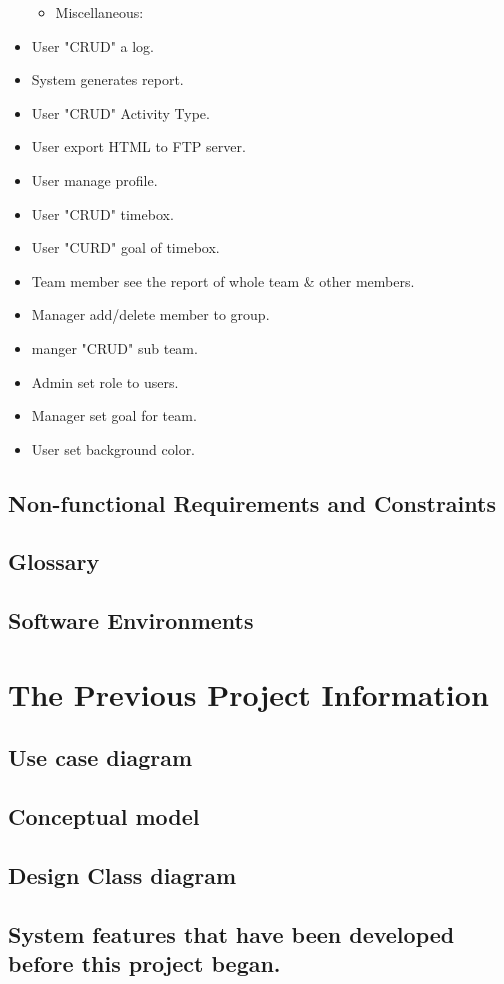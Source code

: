 \documentclass[12pt, a4paper]{article}
\begin{document}
\begin{CJK*}{UTF8}{bkai}
\begin{itemize}
\begin{itemize}
          \item Miscellaneous:
        \end{itemize}
      \item User "CRUD" a log.
      \item System generates report.
      \item User "CRUD" Activity Type.
      \item User export HTML to FTP server.
      \item User manage profile.
      \item User "CRUD" timebox.
      \item User "CURD" goal of timebox.
      \item Team member see the report of whole team \& other members.
      \item Manager add/delete member to group.
      \item manger "CRUD" sub team.
      \item Admin set role to users.
      \item Manager set goal for team.
      \item User set background color.
    \end{itemize}

  \subsection{Non-functional Requirements and Constraints}

  \subsection{Glossary}

  \subsection{Software Environments}

\section{The Previous Project Information}
  \subsection{Use case diagram}

  \subsection{Conceptual model}

  \subsection{Design Class diagram}

  \subsection{System features that have been developed before this project began.}
\end{CJK*}
\end{document}
